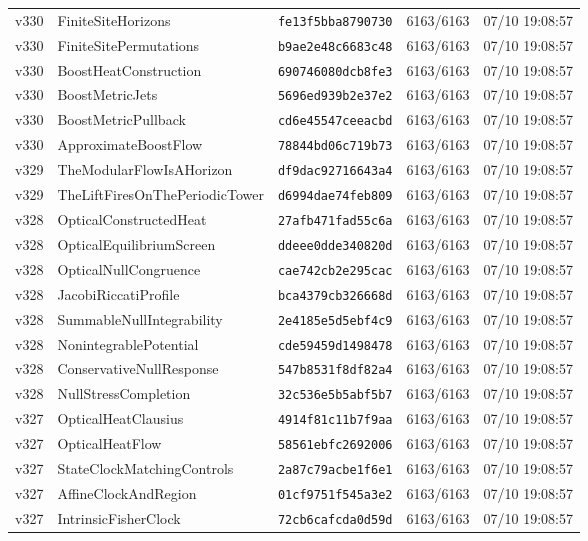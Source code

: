 \documentclass[11pt]{article}
\theoremstyle{definition}\newtheorem{deriv}{Derivation}
\begin{document}
{\begin{longtable}{@{}lllll@{}}
v330 & FiniteSiteHorizons & \texttt{fe13f5bba8790730} & 6163/6163 & 07/10 19:08:57 \\
v330 & FiniteSitePermutations & \texttt{b9ae2e48c6683c48} & 6163/6163 & 07/10 19:08:57 \\
v330 & BoostHeatConstruction & \texttt{690746080dcb8fe3} & 6163/6163 & 07/10 19:08:57 \\
v330 & BoostMetricJets & \texttt{5696ed939b2e37e2} & 6163/6163 & 07/10 19:08:57 \\
v330 & BoostMetricPullback & \texttt{cd6e45547ceeacbd} & 6163/6163 & 07/10 19:08:57 \\
v330 & ApproximateBoostFlow & \texttt{78844bd06c719b73} & 6163/6163 & 07/10 19:08:57 \\
v329 & TheModularFlowIsAHorizon & \texttt{df9dac92716643a4} & 6163/6163 & 07/10 19:08:57 \\
v329 & TheLiftFiresOnThePeriodicTower & \texttt{d6994dae74feb809} & 6163/6163 & 07/10 19:08:57 \\
v328 & OpticalConstructedHeat & \texttt{27afb471fad55c6a} & 6163/6163 & 07/10 19:08:57 \\
v328 & OpticalEquilibriumScreen & \texttt{ddeee0dde340820d} & 6163/6163 & 07/10 19:08:57 \\
v328 & OpticalNullCongruence & \texttt{cae742cb2e295cac} & 6163/6163 & 07/10 19:08:57 \\
v328 & JacobiRiccatiProfile & \texttt{bca4379cb326668d} & 6163/6163 & 07/10 19:08:57 \\
v328 & SummableNullIntegrability & \texttt{2e4185e5d5ebf4c9} & 6163/6163 & 07/10 19:08:57 \\
v328 & NonintegrablePotential & \texttt{cde59459d1498478} & 6163/6163 & 07/10 19:08:57 \\
v328 & ConservativeNullResponse & \texttt{547b8531f8df82a4} & 6163/6163 & 07/10 19:08:57 \\
v328 & NullStressCompletion & \texttt{32c536e5b5abf5b7} & 6163/6163 & 07/10 19:08:57 \\
v327 & OpticalHeatClausius & \texttt{4914f81c11b7f9aa} & 6163/6163 & 07/10 19:08:57 \\
v327 & OpticalHeatFlow & \texttt{58561ebfc2692006} & 6163/6163 & 07/10 19:08:57 \\
v327 & StateClockMatchingControls & \texttt{2a87c79acbe1f6e1} & 6163/6163 & 07/10 19:08:57 \\
v327 & AffineClockAndRegion & \texttt{01cf9751f545a3e2} & 6163/6163 & 07/10 19:08:57 \\
v327 & IntrinsicFisherClock & \texttt{72cb6cafcda0d59d} & 6163/6163 & 07/10 19:08:57 \\

\end{longtable}}
\end{document}
